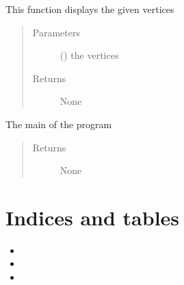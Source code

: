\documentclass[letterpaper,10pt,english]{sphinxmanual}
\begin{document}

\begin{fulllineitems}
\label{\detokenize{UI:UI.display_vertices}}
This function displays the given vertices
\begin{quote}\begin{description}
\item[{Parameters}] \leavevmode
{} () \textendash{} the vertices

\item[{Returns}] \leavevmode
None

\end{description}\end{quote}

\end{fulllineitems}


\begin{fulllineitems}
\label{\detokenize{UI:UI.main}}
The main of the program
\begin{quote}\begin{description}
\item[{Returns}] \leavevmode
None

\end{description}\end{quote}

\end{fulllineitems}



\chapter{Indices and tables}
\label{\detokenize{index:indices-and-tables}}\begin{itemize}
\item {} 

\item {} 

\item {} 

\end{itemize}
\end{document}

